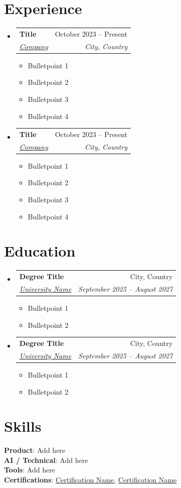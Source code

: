 \documentclass[a4,11pt]{article}
\makeatletter
\newcommand{\resumeItem}[1]{
  \item\small{
    {#1 \vspace*{4pt}}
  }
}
\newcommand{\resumeSubheading}[4]{
  \vspace*{-1pt}\item
    \begin{tabular*}{0.97\textwidth}[t]{l@{\extracolsep{\fill}}r}
      \vspace*{2pt} \textbf{\normalsize#1} & \normalsize#2 \\ 
      \textit{\normalsize#3} & \textit{\normalsize #4} \\
    \end{tabular*}\vspace*{-1pt}
}
\newcommand{\resumeSubHeadingListStart}{\begin{itemize}[leftmargin=0.15in, label={}]}
\newcommand{\resumeSubHeadingListEnd}{\end{itemize}}
\newcommand{\resumeItemListStart}{\begin{itemize}}
\newcommand{\resumeItemListEnd}{\end{itemize}\vspace*{-1pt}}
\makeatother
\begin{document}
\section{Experience}
  
  \resumeSubHeadingListStart
      
    \resumeSubheading
      {Title}{October 2023 -- Present}
      {\href{https://companylink.com}{\underline{Company}}}{City, Country}
      \resumeItemListStart
        \resumeItem{Bulletpoint 1}
        \resumeItem{Bulletpoint 2}        
        \resumeItem{Bulletpoint 3}
        \resumeItem{Bulletpoint 4}
      \resumeItemListEnd

      \resumeSubheading
      {Title}{October 2023 -- Present}
      {\href{https://companylink.com}{\underline{Company}}}{City, Country}
      \resumeItemListStart
        \resumeItem{Bulletpoint 1}
        \resumeItem{Bulletpoint 2}        
        \resumeItem{Bulletpoint 3}
        \resumeItem{Bulletpoint 4}
      \resumeItemListEnd

\resumeSubHeadingListEnd

\section{Education}
  \resumeSubHeadingListStart
    \resumeSubheading
      {Degree Title}{City, Country}
      {\href{https://www.universitylink.com}{\underline{University Name}}}{September 2025 -- August 2027}
      \resumeItemListStart
        \resumeItem{Bulletpoint 1}
        \resumeItem{Bulletpoint 2}
      \resumeItemListEnd

    \resumeSubheading
      {Degree Title}{City, Country}
      {\href{https://www.universitylink.com}{\underline{University Name}}}{September 2025 -- August 2027}
      \resumeItemListStart
        \resumeItem{Bulletpoint 1}
        \resumeItem{Bulletpoint 2}
      \resumeItemListEnd
  \resumeSubHeadingListEnd

\section{Skills}
 \begin{itemize}[leftmargin=0.15in, label={}]
    \small{\item{
     \textbf{Product}{: Add here} \vspace*{5pt} \\
     \textbf{AI / Technical}{: Add here} \vspace*{5pt} \\
     \textbf{Tools}{: Add here} \vspace*{5pt} \\
     \textbf{Certifications}{: \href{link for certification}{\underline{Certification Name}}, \href{link for certification}{\underline{Certification Name}}}
    }}
 \end{itemize}
\end{document}
